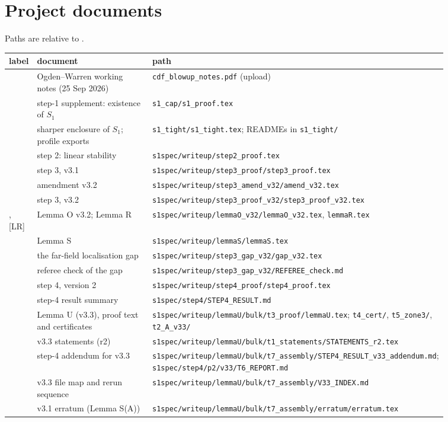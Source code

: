 \documentclass[11pt]{amsart}
\theoremstyle{definition}
\theoremstyle{remark}
\newcommand{\fn}[1]{\texttt{\detokenize{#1}}}
\newcommand{\dref}[1]{[\textsf{#1}]}
\newcommand{\pth}[1]{\nolinkurl{#1}}
\begin{document}
\appendix
\section{Project documents}\label{app:docs}
Paths are relative to \fn{/home/claude/}.
\begin{center}
\footnotesize
\begin{tabular}{@{}lp{0.30\linewidth}p{0.56\linewidth}@{}}\toprule
label & document & path\\\midrule
\dref{OW} & Ogden--Warren working notes (25 Sep 2026) & \pth{cdf_blowup_notes.pdf} (upload)\\
\dref{S1} & step-1 supplement: existence of $S_1$ & \pth{s1_cap/s1_proof.tex}\\
\dref{S1t} & sharper enclosure of $S_1$; profile exports & \pth{s1_tight/s1_tight.tex}; READMEs in \pth{s1_tight/}\\
\dref{S2} & step 2: linear stability & \pth{s1spec/writeup/step2_proof.tex}\\
\dref{S3} & step 3, v3.1 & \pth{s1spec/writeup/step3_proof/step3_proof.tex}\\
\dref{S3a} & amendment v3.2 & \pth{s1spec/writeup/step3_amend_v32/amend_v32.tex}\\
\dref{S3'} & step 3, v3.2 & \pth{s1spec/writeup/step3_proof_v32/step3_proof_v32.tex}\\
\dref{LO}, \dref{LR} & Lemma O v3.2; Lemma R & \pth{s1spec/writeup/lemmaO_v32/lemmaO_v32.tex}, \pth{lemmaR.tex}\\
\dref{LS} & Lemma S & \pth{s1spec/writeup/lemmaS/lemmaS.tex}\\
\dref{GAP} & the far-field localisation gap & \pth{s1spec/writeup/step3_gap_v32/gap_v32.tex}\\
\dref{REF} & referee check of the gap & \pth{s1spec/writeup/step3_gap_v32/REFEREE_check.md}\\
\dref{S4} & step 4, version 2 & \pth{s1spec/writeup/step4_proof/step4_proof.tex}\\
\dref{R4} & step-4 result summary & \pth{s1spec/step4/STEP4_RESULT.md}\\
\dref{LU} & Lemma U (v3.3), proof text and certificates & \pth{s1spec/writeup/lemmaU/bulk/t3_proof/lemmaU.tex}; \pth{t4_cert/}, \pth{t5_zone3/}, \pth{t2_A_v33/}\\
\dref{ST} & v3.3 statements (r2) & \pth{s1spec/writeup/lemmaU/bulk/t1_statements/STATEMENTS_r2.tex}\\
\dref{R4v33} & step-4 addendum for v3.3 & \pth{s1spec/writeup/lemmaU/bulk/t7_assembly/STEP4_RESULT_v33_addendum.md}; \pth{s1spec/step4/p2/v33/T6_REPORT.md}\\
\dref{IDX} & v3.3 file map and rerun sequence & \pth{s1spec/writeup/lemmaU/bulk/t7_assembly/V33_INDEX.md}\\
\dref{ERR} & v3.1 erratum (Lemma S(A)) & \pth{s1spec/writeup/lemmaU/bulk/t7_assembly/erratum/erratum.tex}\\\bottomrule
\end{tabular}\end{center}



\end{document}
